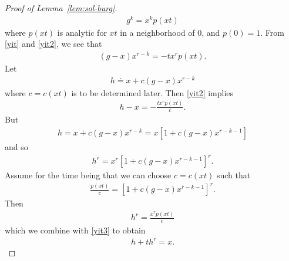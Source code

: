 \documentclass[12pt,reqno]{amsart}
\numberwithin{equation}{section}  %
\numberwithin{figure}{section}
\begin{document}
\begin{proof}[Proof of Lemma~\ref{lem:sol-burg}]
\begin{equation}
  \label{yit2}
\begin{split}
  g^{k} = x^{k}p(xt)
\end{split}
\end{equation}
where $p(xt)$ is analytic for $xt$ in a neighborhood of $0$, and $p(0) = 1$. From \eqref{yit} and \eqref{yit2}, we see that 
%
%
%
%
%
\begin{equation}
  \label{uit}
\begin{split}
  (g-x)x^{r-k}= -t x^{r}p(xt).
\end{split}
\end{equation}
%
%
Let 
%
%
\begin{equation*}
\begin{split}
  h \doteq x + c(g -x)x^{r-k}
\end{split}
\end{equation*}
%
where $c = c(xt)$ is to be determined later.
Then \eqref{yit2} implies
%
%
\begin{equation}
  \label{yit3}
\begin{split}
  h -x = -\frac{t x^{r} p(xt)}{c}.
\end{split}
\end{equation}
%
%
But 
%
%
\begin{equation*}
\begin{split}
  h = x + c(g -x)x^{r-k} = x[1 + c(g-x)x^{r-k-1}]
\end{split}
\end{equation*}
%
and so
%
%
%
\begin{equation*}
\begin{split}
  h^{r} = x^{r}\left[ 1 + c(g-x)x^{r-k-1} \right]^{r}.
\end{split}
\end{equation*}
%
%
Assume for the time being that we can choose $c = c(xt)$ such that
%
%
\begin{equation}
  \label{yit4}
\begin{split}
\frac{p(xt)}{c} = \left[ 1 + c(g-x)x^{r-k-1} \right]^{r}.
\end{split}
\end{equation}
%
%
Then
%
%
\begin{equation*}
\begin{split}
  h^{r} = \frac{x^{r}p(xt)}{c}
\end{split}
\end{equation*}
%
%
which we combine with \eqref{yit3} to obtain
%
%
%
\begin{equation*}
\begin{split}
  h + th^{r} = x.
\end{split}

\end{equation*}
\end{proof}
\end{document}
